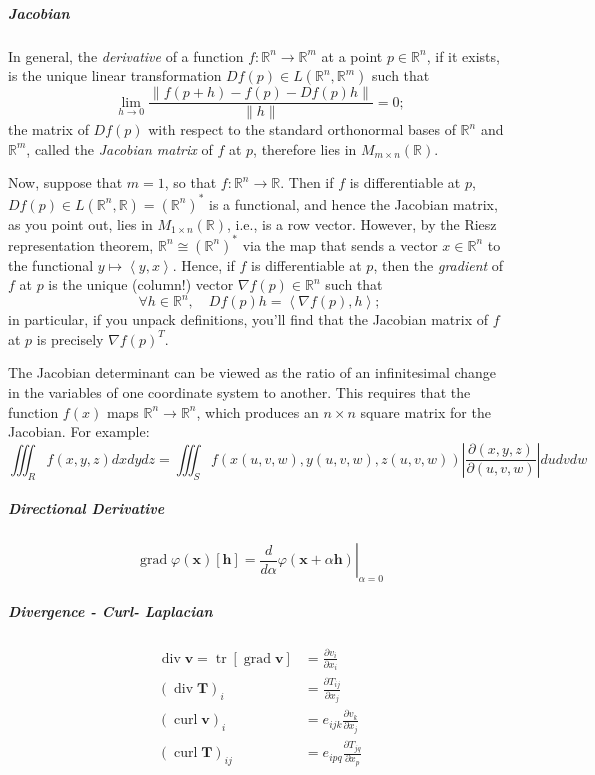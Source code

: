 \hypertarget{jacobian}{%
\subparagraph{Jacobian}\label{jacobian}}

In general, the \emph{derivative} of a function
\(f : \mathbb{R}^n \to \mathbb{R}^m\) at a point \(p \in \mathbb{R}^n\),
if it exists, is the unique linear transformation
\(Df(p) \in L(\mathbb{R}^n,\mathbb{R}^m)\) such that \[
 \lim_{h \to 0} \frac{\|f(p+h)-f(p)-Df(p)h\|}{\|h\|} = 0;
\] the matrix of \(Df(p)\) with respect to the standard orthonormal
bases of \(\mathbb{R}^n\) and \(\mathbb{R}^m\), called the
\emph{Jacobian matrix} of \(f\) at \(p\), therefore lies in
\(M_{m \times n}(\mathbb{R})\).

Now, suppose that \(m=1\), so that \(f : \mathbb{R}^n \to \mathbb{R}\).
Then if \(f\) is differentiable at \(p\),
\(Df(p) \in L(\mathbb{R}^n,\mathbb{R}) = (\mathbb{R}^n)^\ast\) is a
functional, and hence the Jacobian matrix, as you point out, lies in
\(M_{1 \times n}(\mathbb{R})\), i.e., is a row vector. However, by the
Riesz representation theorem, \(\mathbb{R}^n \cong (\mathbb{R}^n)^\ast\)
via the map that sends a vector \(x \in \mathbb{R}^n\) to the functional
\(y \mapsto \left\langle y,x \right\rangle\). Hence, if \(f\) is
differentiable at \(p\), then the \emph{gradient} of \(f\) at \(p\) is
the unique (column!) vector \(\nabla f(p) \in \mathbb{R}^n\) such that
\[
 \forall h \in \mathbb{R}^n, \quad Df(p)h = \left\langle \nabla f(p),h\right\rangle;
\] in particular, if you unpack definitions, you'll find that the
Jacobian matrix of \(f\) at \(p\) is precisely \(\nabla f(p)^T\).

The Jacobian determinant can be viewed as the ratio of an infinitesimal
change in the variables of one coordinate system to another. This
requires that the function \(f(x)\) maps \(\mathbb{R}^n→\mathbb{R}^n\),
which produces an \(n×n\) square matrix for the Jacobian. For example:
\[\iiint_{R} f(x, y, z) d x d y d z=\iiint_{S} f(x(u, v, w), y(u, v, w), z(u, v, w))\left|\frac{\partial(x, y, z)}{\partial(u, v, w)}\right| d u d v d w\]

\hypertarget{directional-derivative}{%
\subparagraph{Directional Derivative}\label{directional-derivative}}

\[\operatorname{grad} \varphi(\mathbf{x})[\mathbf{h}]=\left.\frac{d}{d \alpha} \varphi(\mathbf{x}+\alpha \mathbf{h})\right|_{\alpha=0}\]

\hypertarget{divergence---curl--laplacian}{%
\subparagraph{Divergence - Curl-
Laplacian}\label{divergence---curl--laplacian}}

\[\begin{aligned} \operatorname{div} \mathbf{v}=\operatorname{tr}[\operatorname{grad} \mathbf{v}] &=\frac{\partial v_{i}}{\partial x_{i}} \\(\operatorname{div} \mathbf{T})_{i} &=\frac{\partial T_{i j}}{\partial x_{j}} \\(\operatorname{curl} \mathbf{v})_{i} &=e_{i j k} \frac{\partial v_{k}}{\partial x_{j}} \\(\operatorname{curl} \mathbf{T})_{i j} &=e_{i p q} \frac{\partial T_{j q}}{\partial x_{p}} \end{aligned}\]


